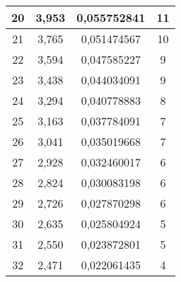 \begin{table}[h]
\begin{tabular}{|c|c|c|c|}
20                                      & 3,953                               & 0,055752841                          & 11                                       \\ \hline
21                                      & 3,765                               & 0,051474567                          & 10                                       \\ \hline
22                                      & 3,594                               & 0,047585227                          & 9                                        \\ \hline
23                                      & 3,438                               & 0,044034091                          & 9                                        \\ \hline
24                                      & 3,294                               & 0,040778883                          & 8                                        \\ \hline
25                                      & 3,163                               & 0,037784091                          & 7                                        \\ \hline
26                                      & 3,041                               & 0,035019668                          & 7                                        \\ \hline
27                                      & 2,928                               & 0,032460017                          & 6                                        \\ \hline
28                                      & 2,824                               & 0,030083198                          & 6                                        \\ \hline
29                                      & 2,726                               & 0,027870298                          & 6                                        \\ \hline
30                                      & 2,635                               & 0,025804924                          & 5                                        \\ \hline
31                                      & 2,550                               & 0,023872801                          & 5                                        \\ \hline
32                                      & 2,471                               & 0,022061435                          & 4                                        \\ \hline

\end{tabular}
\end{table}
